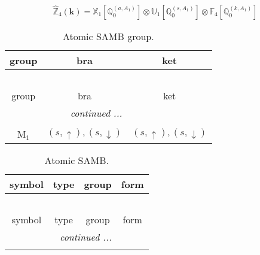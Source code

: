 \documentclass[fleqn,10pt,landscape]{article}
\begin{document}
\begin{itemize}
\begin{dmath*}
\hat{\mathbb{Z}}_{4}(\bm{k})=\mathbb{X}_{1}[\mathbb{Q}_{0}^{(a,A_{1})}] \otimes\mathbb{U}_{1}[\mathbb{Q}_{0}^{(s,A_{1})}] \otimes\mathbb{F}_{4}[\mathbb{Q}_{0}^{(k,A_{1})}]
\end{dmath*}
\begin{center}
\renewcommand{\arraystretch}{1.3}
\begin{longtable}{c|c|c}
\caption{Atomic SAMB group.}
 \\
 \hline \hline
group & bra & ket \\ \hline \endfirsthead

\multicolumn{2}{l}{\tablename\ \thetable{}} \\
 \hline \hline
group & bra & ket \\ \hline \endhead

 \hline \hline
\multicolumn{2}{r}{\footnotesize\it continued ...} \\ \endfoot

 \hline \hline
\multicolumn{2}{r}{} \\ \endlastfoot

M$_{1}$ & $(s,\uparrow), (s,\downarrow)$ & $(s,\uparrow), (s,\downarrow)$ \\
\end{longtable}
\end{center}
\begin{center}
\renewcommand{\arraystretch}{1.3}
\begin{longtable}{c|c|c|c}
\caption{Atomic SAMB.}
 \\
 \hline \hline
symbol & type & group & form \\ \hline \endfirsthead

\multicolumn{3}{l}{\tablename\ \thetable{}} \\
 \hline \hline
symbol & type & group & form \\ \hline \endhead

 \hline \hline
\multicolumn{3}{r}{\footnotesize\it continued ...} \\ \endfoot


\end{longtable}
\end{center}
\end{itemize}
\end{document}
